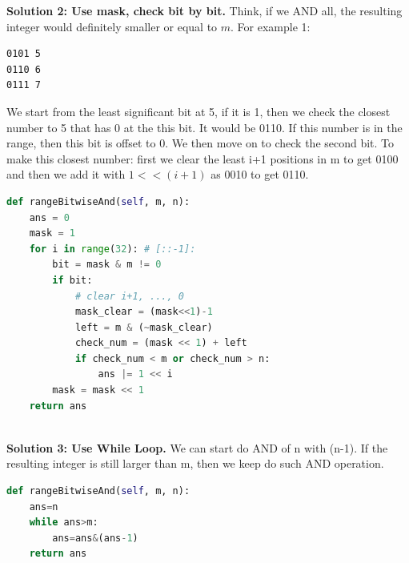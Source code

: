 \documentclass[../main.tex]{subfiles}
\begin{document}
\begin{examples}[resume]
\textbf{Solution 2: Use mask, check bit by bit. } Think, if we AND all, the resulting integer would definitely smaller or equal to $m$. For example 1:
\begin{lstlisting}[numbers=none]
0101 5
0110 6
0111 7
\end{lstlisting}
We start from the least significant bit at 5, if it is 1, then we check the closest number to 5 that has 0 at the this bit. It would be 0110. If this number is in the range, then this bit is offset to 0. We then move on to check the second bit. To make this closest number: first we clear the least i+1 positions in m to get 0100 and then we add it with $1 << (i+1)$ as 0010 to get 0110.
\begin{lstlisting}[language=Python]
def rangeBitwiseAnd(self, m, n):
    ans = 0
    mask = 1
    for i in range(32): # [::-1]:
        bit = mask & m != 0
        if bit:
            # clear i+1, ..., 0
            mask_clear = (mask<<1)-1
            left = m & (~mask_clear)
            check_num = (mask << 1) + left
            if check_num < m or check_num > n:
                ans |= 1 << i
        mask = mask << 1         
    return ans
                  
\end{lstlisting}

\textbf{Solution 3: Use While Loop.} We can start do AND of n with (n-1). If the resulting integer is still larger than m, then we keep do such AND operation.
\begin{lstlisting}[language=Python]
def rangeBitwiseAnd(self, m, n):
    ans=n
    while ans>m:
        ans=ans&(ans-1)
    return ans
\end{lstlisting}
\end{examples}

\end{document}
